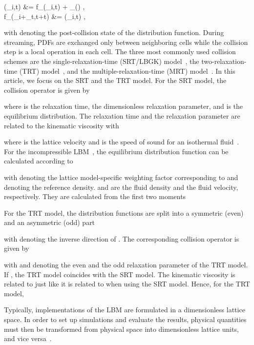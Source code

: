 \documentclass[final,leqno,onefignum,onetabnum]{siamltex1213}
\begin{document}
(_i,t) &= f_\alpha(_i,t) + _\alpha() \label{eq:LBM:collide},\\
f_\alpha(_i+_\alpha \Delta t,t+\Delta t) &= (_i,t) \label{eq:LBM:stream},

with  denoting the post-collision state of the distribution function.
During streaming, PDFs are exchanged only between neighboring cells while the collision step is a local operation in each cell.
The three most commonly used collision schemes are the single-relaxation-time (SRT/LBGK) model~\cite{Bhatnagar1954},
the two-relaxation-time (TRT) model~\cite{Ginzburg2008, Ginzburg2008a},
and the multiple-relaxation-time (MRT) model~\cite{d1994generalized, humieres2002}.
In this article, we focus on the SRT and the TRT model.
For the SRT model, the collision operator is given by

where  is the relaxation time,  the dimensionless relaxation parameter,
and  is the equilibrium distribution.
The relaxation time  and the relaxation parameter  are related to the kinematic viscosity  with

where  is the lattice velocity and  is the speed of sound for an isothermal fluid~\cite{Chen98, Aidun2010}.
For the incompressible LBM~\cite{He97}, the equilibrium distribution function can be calculated according to

with  denoting the lattice model-specific weighting factor corresponding to  and  denoting the reference density.
 and  are the fluid density and the fluid velocity, respectively. They are calculated from the first two moments

For the TRT model, the distribution functions are split into
a symmetric (even) and an asymmetric (odd) part

with  denoting the inverse direction of .
The corresponding collision operator is given by

with  and  denoting the even and the odd relaxation parameter of the TRT model. If
,
the TRT model coincides with the SRT model.
The kinematic viscosity is related to  just like it is related to  when using the SRT model. Hence, for the TRT model,

Typically, implementations of the LBM are formulated in a dimensionless lattice space.
In order to set up simulations and evaluate the results,
physical quantities must then be transformed from physical space into dimensionless lattice units, and vice versa~\cite{lattlbm2008}.
\end{document}
